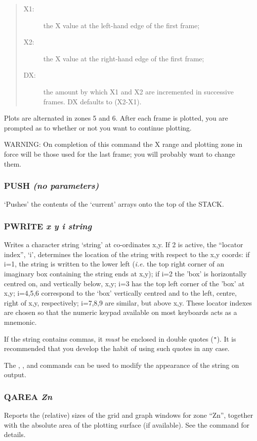 \documentclass[twoside,11pt,noabs,nolof]{starlink}
\providecommand{\dipcom}[3]{\subsubsection*{\label{COM:#1}\textbf{#1} \emph{#2}}}
\newenvironment{dipdesc}{\begin{description}}{\end{description}}
\providecommand{\dipitem}[2]{ \item[{#1}] {#2} }
\begin{document}
\begin{quote}
\begin{dipdesc}
\dipitem {X1:}{ the X value at the left-hand edge of the first frame;}
\dipitem {X2:}{ the X value at the right-hand edge of the first frame;}
\dipitem {DX:}{ the amount by which X1 and X2 are incremented in
successive frames. DX defaults to (X2-X1).}
\end{dipdesc}
\end{quote}

Plots are alternated in zones 5 and 6. After each frame is plotted,
you are prompted as to whether or not you want to continue plotting.

WARNING: On completion of this command the X range and plotting zone
in force will be those used for the last frame; you will probably want
to change them.

\dipcom{PUSH}{(no parameters)}{Pushes the current arrays onto the stack}
`Pushes' the contents of the `current' arrays onto the top of the STACK.

\dipcom{PWRITE}{x y i string}{Writes a character string at given co-ordinates}
Writes a character string `string' at co-ordinates x,y. If   2 is
active, the ``locator index'', `i', determines the location of the
string with respect to the x,y coords: if i=1, the string is written
to the lower left (\emph{i.e.} the top right corner of an imaginary
box containing the string ends at x,y); if i=2 the 'box' is
horizontally centred on, and vertically below, x,y; i=3 has the top
left corner of the 'box' at x,y; i=4,5,6 correspond to the `box'
vertically centred and to the left, centre, right of x,y,
respectively; i=7,8,9 are similar, but above x,y. These locator
indexes are chosen so that the numeric keypad available on most
keyboards acts as a mnemonic.

If the string contains commas, it \emph{must} be enclosed in double
quotes ({\texttt{"}}).  It is recommended that you develop the habit of
using such quotes in any case.

The ,  ,  and   commands can be used to modify the
appearance of the string on output.

\dipcom{QAREA}{Zn}{Gives information about a plotting zone}
Reports the (relative) sizes of the grid and graph windows for zone
``Zn'', together with the absolute area of the plotting surface (if
available). See the   command for details.
\end{document}
